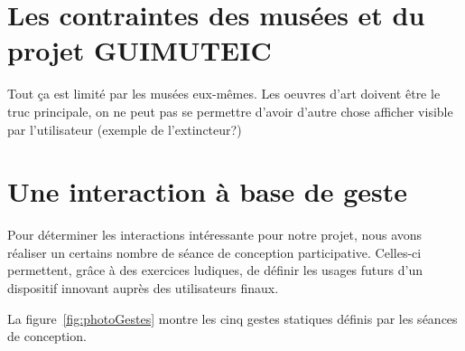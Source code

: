 \section{Les contraintes des musées et du projet GUIMUTEIC}

Tout ça est limité par les musées eux-mêmes. Les oeuvres d'art doivent être le truc principale, on ne peut pas se permettre d'avoir d'autre chose afficher visible par l'utilisateur (exemple de l'extincteur?)



\section{Une interaction à base de geste}

Pour déterminer les interactions intéressante pour notre projet, nous avons réaliser un certains nombre de séance de conception participative.
Celles-ci permettent, grâce à des exercices ludiques, de définir les usages futurs d’un dispositif innovant auprès des utilisateurs finaux. 

La figure~\ref{fig:photoGestes} montre les cinq gestes statiques définis par les séances de conception.


